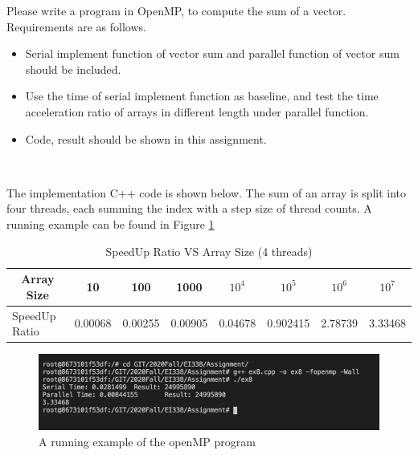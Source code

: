 \begin{exercise}[]{
    \item Please write a program in OpenMP, to compute the sum of a vector. Requirements are as follows.
    \begin{itemize}
        \item Serial implement function of vector sum and parallel function of vector sum should be included.
        \item Use the time of serial implement function as baseline, and test the time acceleration ratio of arrays in different length under parallel function. 
        \item Code, result should be shown in this assignment.
    \end{itemize}}
  \begin{solution}
  \par{~}

  The implementation C++ code is shown below. The sum of an array is split into four threads, each summing the index with a step size of thread counts. A running example can be found in Figure \ref{fig:ex3}

  \begin{table}[p]
    \begin{center}
      \begin{tabular}{llllllll}
      \hline
      \multicolumn{1}{c}{\textbf{Array Size}} & \multicolumn{1}{c}{10} & \multicolumn{1}{c}{100} & \multicolumn{1}{c}{1000} & \multicolumn{1}{c}{\textbf{$10^4$}} & \multicolumn{1}{c}{\textbf{$10^5$}} & \multicolumn{1}{c}{\textbf{$10^6$}} & \multicolumn{1}{c}{\textbf{$10^7$}} \\ \hline
SpeedUp Ratio                           & 0.00068                         & 0.00255                         & 0.00905                           & 0.04678                             & 0.902415                            & 2.78739                            & 3.33468                             \\ \hline

      \end{tabular}
    \end{center}
    \caption{SpeedUp Ratio VS Array Size (4 threads)}
  \end{table}

  \begin{figure}[p]
    \begin{center}
        \includegraphics[width=0.5\linewidth]{ex8.png}
        \caption{A running example of the openMP program}
        \label{fig:ex3}
    \end{center}
  \end{figure}



  \end{solution}
  \label{ex3}
\end{exercise}



